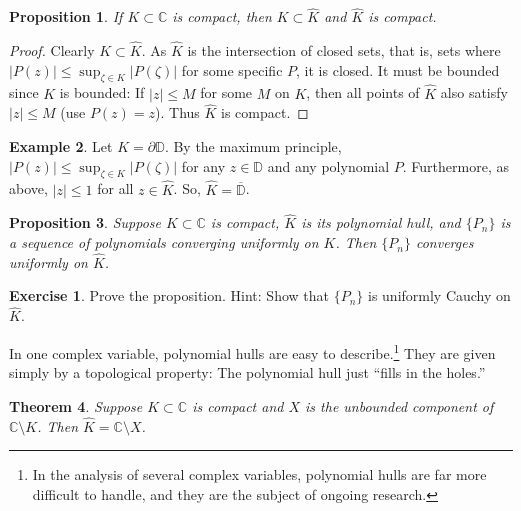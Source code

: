 \documentclass[12pt,openany]{book}
\newcommand{\sabs}[1]{\lvert {#1} \rvert}
\newcommand{\babs}[1]{\bigl\lvert {#1} \bigr\rvert}
\newcommand{\C}{{\mathbb{C}}}
\newcommand{\D}{{\mathbb{D}}}
\newcommand{\myquote}[1]{``#1''}
\theoremstyle{plain}
\newtheorem{thm}{Theorem}[section]
\newtheorem{prop}[thm]{Proposition}
\theoremstyle{remark}
\theoremstyle{definition}
\newenvironment{exbox}{%
    \def\FrameCommand{\vrule width 1pt \relax\hspace{10pt}}%
    \MakeFramed{\advance\hsize-\width\FrameRestore}%
}{%
    \endMakeFramed
}
\theoremstyle{exercise}
\newtheorem{exercise}{Exercise}[section]
\theoremstyle{example}
\newtheorem{example}[thm]{Example}
\begin{document}
\begin{prop}
If $K \subset \C$ is compact, then $K \subset \widehat{K}$ and $\widehat{K}$
is compact.
\end{prop}

\begin{proof}
Clearly $K \subset \widehat{K}$.  As $\widehat{K}$
is the intersection of closed sets, that is, sets where
$\babs{P(z)} \leq \sup_{\zeta \in K} \babs{P(\zeta)}$ for some specific $P$, it is closed.
It must be
bounded since $K$ is bounded:  If $\sabs{z} \leq M$ for some $M$ on $K$,
then all points of $\widehat{K}$ also satisfy $\sabs{z} \leq M$ (use $P(z)=z$).
Thus $\widehat{K}$ is compact.
\end{proof}

\begin{example}
Let $K = \partial \D$.  By the maximum principle,
$\babs{P(z)} \leq \sup_{\zeta \in K} \babs{P(\zeta)}$ for any $z \in \D$
and any polynomial $P$.
Furthermore, as above, $\sabs{z} \leq 1$ for all $z \in \widehat{K}$.
So, $\widehat{K} = \overline{\D}$.
\end{example}

\begin{prop} \label{prop:convergenceonKhat}
Suppose $K \subset \C$ is compact, $\widehat{K}$ is its polynomial hull,
and $\{ P_n \}$ is a sequence of polynomials converging uniformly on
$K$.  Then $\{ P_n \}$ converges uniformly on $\widehat{K}$.  
\end{prop}

\begin{exbox}
\begin{exercise}
Prove the proposition.  Hint: Show that $\{ P_n \}$ is uniformly Cauchy on
$\widehat{K}$.
\end{exercise}
\end{exbox}

In one complex variable, polynomial hulls are easy to
describe.\footnote{In the analysis of several complex variables,
polynomial hulls are far more difficult to handle, and they are the subject
of ongoing research.}
They are given simply by a topological property: The polynomial
hull just \myquote{fills in the holes.}


\begin{thm}\label{thm:polyhull}
Suppose $K \subset \C$ is compact and $X$ is the unbounded component of
$\C \setminus K$.  Then $\widehat{K} = \C \setminus X$.
\end{thm}
\end{document}
